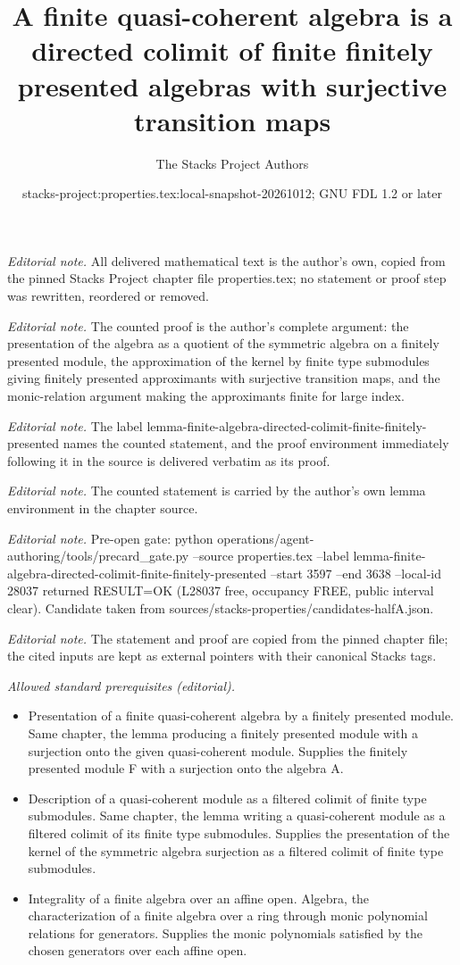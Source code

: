 \documentclass[10pt,a4paper]{amsart}
\title{A finite quasi-coherent algebra is a directed colimit of finite finitely presented algebras with surjective transition maps}
\author{The Stacks Project Authors}
\date{stacks-project:properties.tex:local-snapshot-20261012; GNU FDL 1.2 or later}
\theoremstyle{plain}
\theoremstyle{definition}
\theoremstyle{remark}
\numberwithin{equation}{subsection}
\begin{document}
\maketitle
\noindent\textit{Editorial note.} All delivered mathematical text is the author's own, copied from the pinned Stacks Project chapter file properties.tex; no statement or proof step was rewritten, reordered or removed.\par\medskip
\noindent\textit{Editorial note.} The counted proof is the author's complete argument: the presentation of the algebra as a quotient of the symmetric algebra on a finitely presented module, the approximation of the kernel by finite type submodules giving finitely presented approximants with surjective transition maps, and the monic-relation argument making the approximants finite for large index.\par\medskip
\noindent\textit{Editorial note.} The label lemma-finite-algebra-directed-colimit-finite-finitely-presented names the counted statement, and the proof environment immediately following it in the source is delivered verbatim as its proof.\par\medskip
\noindent\textit{Editorial note.} The counted statement is carried by the author's own lemma environment in the chapter source.\par\medskip
\noindent\textit{Editorial note.} Pre-open gate: python operations/agent-authoring/tools/precard\_gate.py --source properties.tex --label lemma-finite-algebra-directed-colimit-finite-finitely-presented --start 3597 --end 3638 --local-id 28037 returned RESULT=OK (L28037 free, occupancy FREE, public interval clear). Candidate taken from sources/stacks-properties/candidates-halfA.json.\par\medskip
\noindent\textit{Editorial note.} The statement and proof are copied from the pinned chapter file; the cited inputs are kept as external pointers with their canonical Stacks tags.\par\medskip
\noindent\textit{Allowed standard prerequisites (editorial).}\begin{itemize}
\item Presentation of a finite quasi-coherent algebra by a finitely presented module. Same chapter, the lemma producing a finitely presented module with a surjection onto the given quasi-coherent module. Supplies the finitely presented module F with a surjection onto the algebra A.
\item Description of a quasi-coherent module as a filtered colimit of finite type submodules. Same chapter, the lemma writing a quasi-coherent module as a filtered colimit of its finite type submodules. Supplies the presentation of the kernel of the symmetric algebra surjection as a filtered colimit of finite type submodules.
\item Integrality of a finite algebra over an affine open. Algebra, the characterization of a finite algebra over a ring through monic polynomial relations for generators. Supplies the monic polynomials satisfied by the chosen generators over each affine open.
\end{itemize}\medskip
\end{document}

